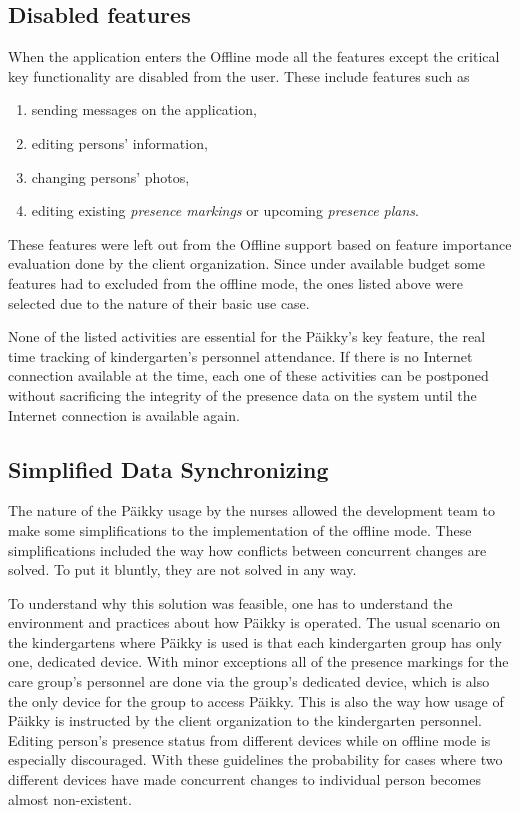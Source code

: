 \subsection{Disabled features}
When the application enters the Offline mode all the features except the critical key functionality are disabled from the user. These include features such as

\begin{enumerate}
    \item sending messages on the application,
    \item editing persons' information,
    \item changing persons' photos,
    \item editing existing \textit{presence markings} or upcoming \textit{presence plans}.
\end{enumerate}

These features were left out from the Offline support based on feature importance evaluation done by the client organization. Since under available budget some features had to excluded from the offline mode, the ones listed above were selected due to the nature of their basic use case.

None of the listed activities are essential for the Päikky's key feature, the real time tracking of kindergarten's personnel attendance. If there is no Internet connection available at the time, each one of these activities can be postponed without sacrificing the integrity of the presence data on the system until the Internet connection is available again.




\subsection{Simplified Data Synchronizing}
The nature of the Päikky usage by the nurses allowed the development team to make some simplifications to the implementation of the offline mode. These simplifications included the way how conflicts between concurrent changes are solved. To put it bluntly, they are not solved in any way.

To understand why this solution was feasible, one has to understand the environment and practices about how Päikky is operated. The usual scenario on the kindergartens where Päikky is used is that each kindergarten group has only one, dedicated device. With minor exceptions all of the presence markings for the care group's personnel are done via the group's dedicated device, which is also the only device for the group to access Päikky. This is also the way how usage of Päikky is instructed by the client organization to the kindergarten personnel. Editing person's presence status from different devices while on offline mode is especially discouraged. With these guidelines the probability for cases where two different devices have made concurrent changes to individual person becomes almost non-existent. 

